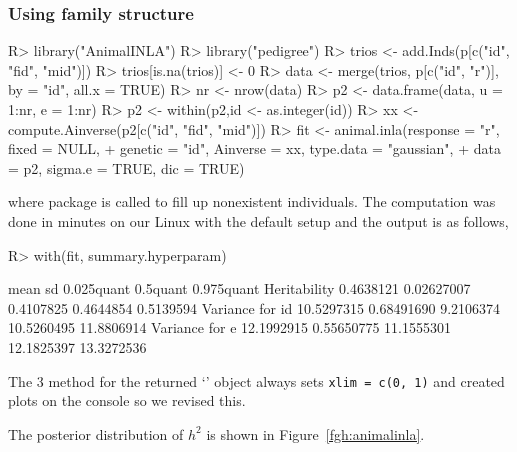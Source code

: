 \documentclass[article]{jss}
\begin{document}
\subsubsection{Using family structure}
%
\begin{CodeChunk}
\begin{CodeInput}
R> library("AnimalINLA")
R> library("pedigree")
R> trios <- add.Inds(p[c("id", "fid", "mid")])
R> trios[is.na(trios)] <- 0
R> data <- merge(trios, p[c("id", "r")], by = "id", all.x = TRUE)
R> nr <- nrow(data)
R> p2 <- data.frame(data, u = 1:nr, e = 1:nr)
R> p2 <- within(p2,id <- as.integer(id))
R> xx <- compute.Ainverse(p2[c("id", "fid", "mid")])
R> fit <- animal.inla(response = "r", fixed = NULL, 
+    genetic = "id", Ainverse = xx, type.data = "gaussian",
+    data = p2, sigma.e = TRUE, dic = TRUE)
\end{CodeInput}
\end{CodeChunk}
%
where package  \citep{coster13} is called to fill up nonexistent individuals.
The computation was done in minutes on our Linux with the default setup 
and the output is as follows,
%
\begin{CodeChunk}
\begin{CodeInput}
R> with(fit, summary.hyperparam)
\end{CodeInput}
\begin{CodeOutput}
                      mean         sd 0.025quant   0.5quant 0.975quant
Heritability     0.4638121 0.02627007  0.4107825  0.4644854  0.5139594
Variance for id 10.5297315 0.68491690  9.2106374 10.5260495 11.8806914
Variance for e  12.1992915 0.55650775 11.1555301 12.1825397 13.3272536
\end{CodeOutput}
\end{CodeChunk}
%
The 3  method for the returned
`' object always sets \verb/xlim = c(0, 1)/ and
created plots on the console so we revised this.
%
\begin{CodeChunk}
\end{CodeChunk}
%
The posterior distribution of $h^2$ is shown in Figure~\ref{fgh:animalinla}.
\end{document}

